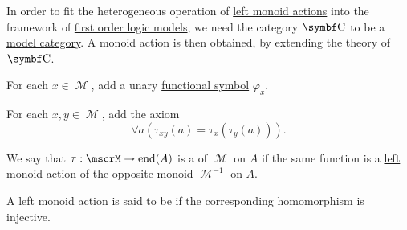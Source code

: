 \begin{remark}\label{rem:theory_of_left_monoid_actions}
  In order to fit the heterogeneous operation of \hyperref[def:left_monoid_action]{left monoid actions} into the framework of \hyperref[def:first_order_semantics/satisfiability]{first order logic models}, we need the category \( \Cat{C} \) to be a \hyperref[def:first_order_model_category]{model category}. A monoid action is then obtained, by extending the theory of \( \Cat{C} \).

  \begin{RemEnum}
     For each \( x \in \mscrM \), add a unary \hyperref[def:first_order_language/func]{functional symbol} \( \varphi_x \).

     For each \( x, y \in \mscrM \), add the axiom
    \begin{equation}\label{eq:rem:theory_of_left_monoid_actions/axiom_schema}
      \forall a (\tau_{xy}(a) = \tau_x(\tau_y(a))).
    \end{equation}
  \end{RemEnum}
\end{remark}

\begin{definition}\label{def:right_monoid_action}
  We say that \( \tau: \mscrM \to \End(A) \) is a  of \( \mscrM \) on \( A \) if the same function is a \hyperref[def:left_monoid_action]{left monoid action} of the \hyperref[def:magma/opposite]{opposite monoid} \( \mscrM^{-1} \) on \( A \).
\end{definition}

\begin{definition}\label{def:faithful_left_monoid_action}
  A left monoid action is said to be  if the corresponding homomorphism is injective.
\end{definition}

